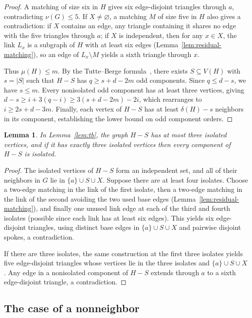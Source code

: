 \documentclass[11pt]{article}
\newtheorem{lemma}[theorem]{Lemma}
\begin{document}
\begin{proof}
A matching of size six in $H$ gives six edge-disjoint triangles through $a$, contradicting $\nu(G)\leq 5$. If $X\neq\varnothing$, a matching $M$ of size five in $H$ also gives a contradiction: if $X$ contains an edge, any triangle containing it shares no edge with the five triangles through $a$; if $X$ is independent, then for any $x\in X$, the link $L_x$ is a subgraph of $H$ with at least six edges (Lemma~\ref{lem:residual-matching}), so an edge of $L_x\setminus M$ yields a sixth triangle through $x$.

Thus $\mu(H)\leq m$. By the Tutte--Berge formula~\cite{Schrijver}, there exists $S\subseteq V(H)$ with $s=|S|$ such that $H-S$ has $q\geq s+d-2m$ odd components. Since $q\leq d-s$, we have $s\leq m$. Every nonisolated odd component has at least three vertices, giving $d-s\geq i+3(q-i)\geq 3(s+d-2m)-2i$, which rearranges to $i\geq 2s+d-3m$. Finally, each vertex of $H-S$ has at least $\delta(H)-s$ neighbors in its component, establishing the lower bound on odd component orders.
\end{proof}

\begin{lemma}\label{lem:isolates}
In Lemma~\ref{lem:tb}, the graph $H-S$ has at most three isolated vertices, and if it has exactly three isolated vertices then every component of $H-S$ is isolated.
\end{lemma}

\begin{proof}
The isolated vertices of $H-S$ form an independent set, and all of their neighbors in $G$ lie in $\{a\}\cup S\cup X$. Suppose there are at least four isolates. Choose a two-edge matching in the link of the first isolate, then a two-edge matching in the link of the second avoiding the two used base edges (Lemma~\ref{lem:residual-matching}), and finally one unused link edge at each of the third and fourth isolates (possible since each link has at least six edges). This yields six edge-disjoint triangles, using distinct base edges in $\{a\}\cup S\cup X$ and pairwise disjoint spokes, a contradiction.

If there are three isolates, the same construction at the first three isolates yields five edge-disjoint triangles whose vertices lie in the three isolates and $\{a\}\cup S\cup X$. Any edge in a nonisolated component of $H-S$ extends through $a$ to a sixth edge-disjoint triangle, a contradiction.
\end{proof}

\subsection{The case of a nonneighbor}
\end{document}

